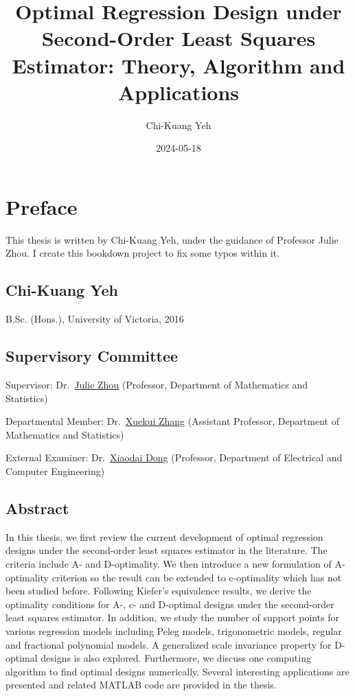 \documentclass[
]{book}
\title{Optimal Regression Design under Second-Order Least Squares Estimator: Theory, Algorithm and Applications}
\author{Chi-Kuang Yeh}
\date{2024-05-18}
\theoremstyle{definition}
\theoremstyle{definition}
\theoremstyle{definition}
\theoremstyle{definition}
\theoremstyle{remark}
\begin{document}
\maketitle

{
\setcounter{tocdepth}{1}
\tableofcontents
}
\newcommand{\btheta}{\mathbf{\theta}}

\chapter{Preface}\label{preface}

This thesis is written by Chi-Kuang Yeh, under the guidance of Professor Julie Zhou. I create this bookdown project to fix some typos within it.

\section{Chi-Kuang Yeh}\label{chi-kuang-yeh}

B.Sc. (Hons.), University of Victoria, 2016

\section{Supervisory Committee}\label{supervisory-committee}

Supervisor: Dr.~\href{https://www.uvic.ca/science/math-statistics/people/home/faculty/zhou_julie.php}{Julie Zhou} (Professor, Department of Mathematics and Statistics)

Departmental Member: Dr.~\href{https://www.uvic.ca/science/math-statistics/people/home/faculty/zhang_xuekui.php}{Xuekui Zhang} (Assistant Professor, Department of Mathematics and Statistics)

External Examiner: Dr.~\href{https://www.uvic.ca/ecs/ece/faculty-and-staff/home/faculty/dongxiaodai.php}{Xiaodai Dong} (Professor, Department of Electrical and Computer Engineering)

\section{Abstract}\label{abstract}

In this thesis, we first review the current development of optimal regression designs under the second-order least squares estimator in the literature. The criteria include A- and D-optimality. We then introduce a new formulation of A-optimality criterion so the result can be extended to c-optimality which has not been studied before. Following Kiefer's equivalence results, we derive the optimality conditions for A-, c- and D-optimal designs under the second-order least squares estimator. In addition, we study the number of support points for various regression models including Peleg models, trigonometric models, regular and fractional polynomial models. A generalized scale invariance property for D-optimal designs is also explored. Furthermore, we discuss one computing algorithm to find optimal designs numerically. Several interesting applications are presented and related MATLAB code are provided in the thesis.
\end{document}
